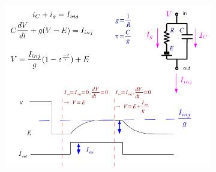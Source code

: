 \documentclass[english,11pt]{article}
\begin{document}
\begin{itemize}
\begin{figure}[H]
\begin{subfigure}[b]{0.5\textwidth}
        \end{subfigure}%
        ~
        \begin{subfigure}[b]{0.5\textwidth}
                \centering
				\includegraphics[width=\textwidth]{ohmic-model3.png}
        \end{subfigure}
\end{figure}

\end{itemize}
\end{document}
